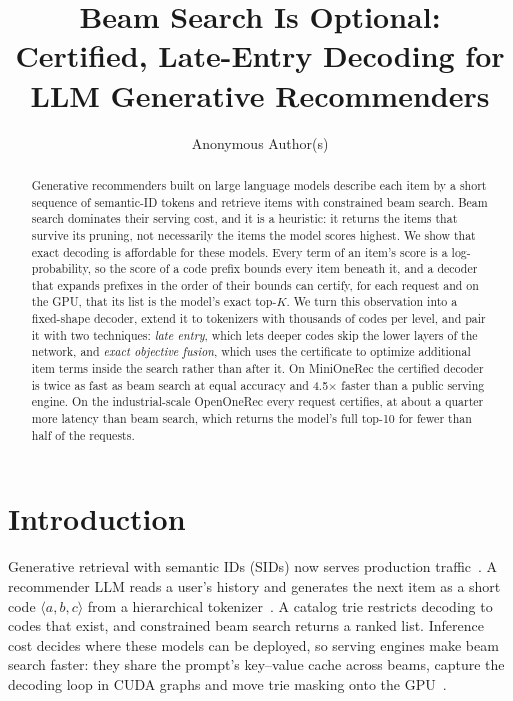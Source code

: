 \documentclass[sigconf,anonymous]{acmart}
\begin{document}
\title{Beam Search Is Optional: Certified, Late-Entry Decoding for LLM Generative Recommenders}

\author{Anonymous Author(s)}

\begin{abstract}
Generative recommenders built on large language models describe each item by a short sequence of semantic-ID
tokens and retrieve items with constrained beam search. Beam search dominates their serving cost, and it is a
heuristic: it returns the items that survive its pruning, not necessarily the items the model scores highest. We
show that exact decoding is affordable for these models. Every term of an item's score is a log-probability, so the
score of a code prefix bounds every item beneath it, and a decoder that expands prefixes in the order of their
bounds can certify, for each request and on the GPU, that its list is the model's exact top-$K$. We turn this
observation into a fixed-shape decoder, extend it to tokenizers with thousands of codes per level, and pair it with
two techniques: \emph{late entry}, which lets deeper codes skip the lower layers of the network, and \emph{exact
objective fusion}, which uses the certificate to optimize additional item terms inside the search rather than
after it. On MiniOneRec the certified decoder is twice as fast as beam search at equal accuracy and 4.5$\times$
faster than a public serving engine. On the industrial-scale OpenOneRec every request certifies, at about a
quarter more latency than beam search, which returns the model's full top-10 for fewer than half of the requests.
\end{abstract}


\maketitle

\section{Introduction}

Generative retrieval with semantic IDs (SIDs) now serves production traffic~\cite{ax2506.13695,ax2602.22732,
ax2608.00938,ax2504.10507,spotify2026}. A recommender LLM reads a user's history and generates the next item as a
short code $\langle a,b,c\rangle$ from a hierarchical tokenizer~\cite{rajput2023}. A catalog trie restricts
decoding to codes that exist, and constrained beam search returns a ranked list. Inference cost decides where these
models can be deployed, so serving engines make beam search faster: they share the prompt's key--value cache across
beams, capture the decoding loop in CUDA graphs and move trie masking onto the GPU~\cite{flashrec,nvidiasidgr,
ax2512.11529,ax2602.22647}.
\end{document}
